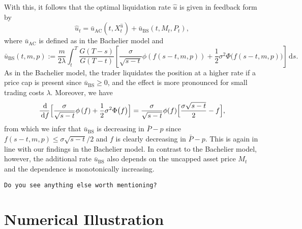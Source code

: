 \documentclass[11pt]{article}
\theoremstyle{definition}
\theoremstyle{remark}
\newcommand{\ts}{\textstyle}
\newcommand{\de}{\,\mathrm{d}}
\begin{document}
With this, it follows that the optimal liquidation rate $\hat{u}$ is given in feedback form by
\[
 \hat{u}_t = \bar{u}_{\mathrm{AC}}(t,X^{\hat{u}}_t) + \bar{u}_{\mathrm{BS}}(t,M_t,P_t),
\]
where $\bar{u}_{\mathrm{AC}}$ is defined as in the Bachelier model and
\[
 \bar{u}_{\mathrm{BS}}(t,m,p) := \frac{m}{2\lambda}\int_t^T  \frac{G(T-s)}{G(T-t)} \left[ \frac{\sigma}{\sqrt{s-t}}\phi\left(f(s-t,m,p)\right)+\frac{1}{2}\sigma^2 \Phi\bigl(f(s-t,m,p)\bigr)\right] \de s.
\]
As in the Bachelier model, the trader liquidates the position at a higher rate if a price cap is present since $\bar{u}_{\mathrm{BS}}\ge 0$, and the effect is more pronounced for small trading costs $\lambda$. Moreover, we have
\[
 \frac{\de }{\de f} \Bigl[\frac{\sigma}{\sqrt{s-t}}\phi\left(f\right)+\frac{1}{2}\sigma^2 \Phi\bigl(f\bigr)\Bigr] = \frac{\sigma}{\sqrt{s-t}}\phi(f)\Bigl[\frac{\sigma\sqrt{s-t}}{2} - f\Bigr],
\]
from which we infer that $\bar{u}_{\mathrm{BS}}$ is decreasing in $\bar P - p$ since $f(s-t,m,p) \leq \sigma\sqrt{s-t}/2$ and $f$ is clearly decreasing in $\bar P - p$. This is again in line with our findings in the Bachelier model. In contrast to the Bachelier model, however, the additional rate $\bar{u}_{\mathrm{BS}}$ also depends on the uncapped asset price $M_t$ and the dependence is monotonically increasing.

{\color{red}
\texttt{Do you see anything else worth mentioning?}
}


\section{Numerical Illustration}\label{sec:Numerics}
\end{document}
